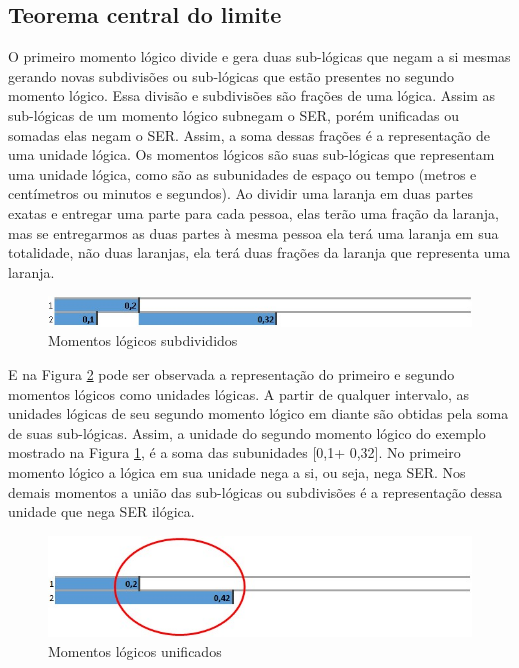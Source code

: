 \subsection{Teorema central do limite}

O primeiro momento lógico divide e gera duas sub-lógicas que negam a si mesmas gerando novas subdivisões ou sub-lógicas que estão presentes no segundo momento lógico. Essa divisão e subdivisões são frações de uma lógica.  Assim as sub-lógicas de um momento lógico subnegam o SER, porém unificadas ou somadas elas negam o SER. Assim, a soma dessas frações é a representação de uma unidade lógica. Os momentos lógicos são suas sub-lógicas que representam uma unidade lógica, como são as subunidades de espaço ou tempo (metros e centímetros ou minutos e segundos). Ao dividir uma laranja em duas partes exatas e entregar uma parte para cada pessoa, elas terão uma fração da laranja, mas se entregarmos as duas partes à mesma pessoa ela terá uma laranja em sua totalidade, não duas laranjas, ela terá duas frações da laranja que representa uma laranja.

\begin{figure}[H]
\caption{Momentos lógicos subdivididos}
\label{fig:second_logical_moment}
\centering
\includegraphics[scale=.85]{sections/images/second_logical_moment.jpg}
\end{figure}

E na Figura \ref{fig:logical_units} pode ser observada a representação do primeiro e segundo momentos lógicos como unidades lógicas. A partir de qualquer intervalo, as unidades lógicas de seu segundo momento lógico em diante são obtidas pela soma de suas sub-lógicas. Assim, a unidade do segundo momento lógico do exemplo mostrado na Figura \ref{fig:second_logical_moment}, é a soma das subunidades [0,1+ 0,32]. No primeiro momento lógico a lógica em sua unidade nega a si, ou seja, nega SER. Nos demais momentos a união das sub-lógicas ou subdivisões é a representação dessa unidade que nega SER ilógica.

\begin{figure}[H]
\caption{Momentos lógicos unificados}
\label{fig:logical_units}
\centering
\includegraphics[scale=.85]{sections/images/logical_units.jpg}
\end{figure}


